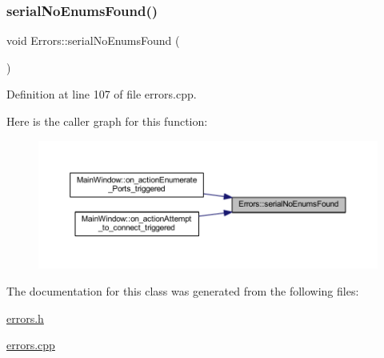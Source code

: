 \subsubsection{\texorpdfstring{serialNoEnumsFound()}{serialNoEnumsFound()}}
{\footnotesize\ttfamily void Errors\+::serial\+No\+Enums\+Found (\begin{DoxyParamCaption}{ }\end{DoxyParamCaption})\hspace{0.3cm}{\ttfamily [static]}}



Definition at line 107 of file errors.\+cpp.

Here is the caller graph for this function\+:
\nopagebreak
\begin{figure}[H]
\begin{center}
\leavevmode
\includegraphics[width=350pt]{class_errors_a4d1bdcbd36b5df8317a4511226c5d55a_icgraph}
\end{center}
\end{figure}


The documentation for this class was generated from the following files\+:\begin{DoxyCompactItemize}
\item 
\mbox{\hyperlink{errors_8h}{errors.\+h}}\item 
\mbox{\hyperlink{errors_8cpp}{errors.\+cpp}}\end{DoxyCompactItemize}
